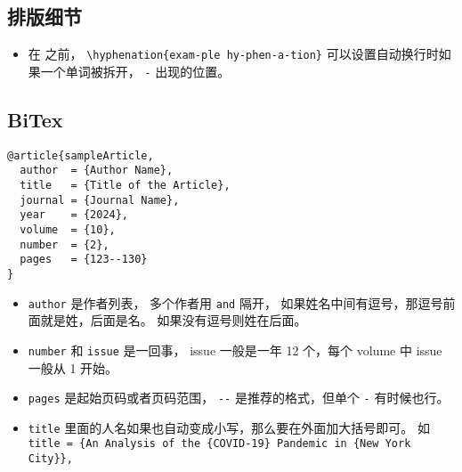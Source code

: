 
\begin{issues}
\issueDraft
\end{issues}

\subsection{排版细节}
\begin{itemize}
\item 在 \verb`` 之前， \verb`\hyphenation{exam-ple hy-phen-a-tion}` 可以设置自动换行时如果一个单词被拆开， \verb`-` 出现的位置。
\end{itemize}

\subsection{BiTex}

\begin{lstlisting}[language=none, caption=BibTeX 的例子]
@article{sampleArticle,
  author  = {Author Name},
  title   = {Title of the Article},
  journal = {Journal Name},
  year    = {2024},
  volume  = {10},
  number  = {2},
  pages   = {123--130}
}
\end{lstlisting}

\begin{itemize}
\item \verb`author` 是作者列表， 多个作者用 \verb`and` 隔开， 如果姓名中间有逗号，那逗号前面就是姓，后面是名。 如果没有逗号则姓在后面。
\item \verb`number` 和 \verb`issue` 是一回事， issue 一般是一年 12 个，每个 volume 中 issue 一般从 1 开始。
\item \verb`pages` 是起始页码或者页码范围， \verb`--` 是推荐的格式，但单个 \verb`-` 有时候也行。
\item \verb`title` 里面的人名如果也自动变成小写，那么要在外面加大括号即可。 如 \verb`title = {An Analysis of the {COVID-19} Pandemic in {New York City}},`
\end{itemize}
